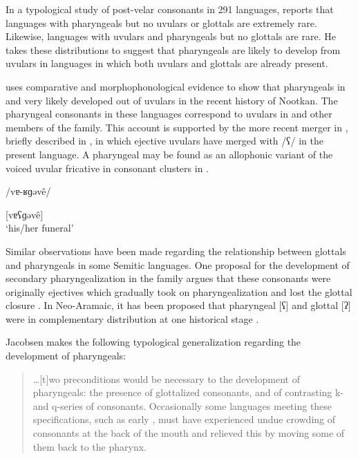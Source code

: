   In a typological study of post-velar consonants in 291 languages, \citet[49]{Sylak-Glassman2014} reports that languages with pharyngeals but no uvulars or glottals are extremely rare. Likewise, languages with uvulars and pharyngeals but no glottals are rare. He takes these distributions to suggest that pharyngeals are likely to develop from uvulars in languages in which both uvulars and glottals are already present.

  \citet{Jacobsen1969} uses comparative and morphophonological evidence to show that pharyngeals in  and  very likely developed out of uvulars in the recent history of Nootkan. The pharyngeal consonants in these languages correspond to uvulars in  and other members of the family. This account is supported by the more recent merger in , briefly described in , in which ejective uvulars have merged with /ʕ/ in the present language. A pharyngeal may be found as an allophonic variant of the voiced uvular fricative in consonant clusters in  .

\ea\label{ex:4.47}

/vɐ-ʁɡəvê/

[vɐʕɡəvê]\\
\glt ‘his/her funeral’
\citep[62]{Gong2018}
\z

  Similar observations have been made regarding the relationship between glottals and pharyngeals in some Semitic languages. One proposal for the development of secondary pharyngealization in the family argues that these consonants were originally ejectives which gradually took on pharyngealization and lost the glottal closure \citep{Zemánek1996}. In Neo-Aramaic, it has been proposed that pharyngeal [ʕ] and glottal [ʔ] were in complementary distribution at one historical stage \citep{Hoberman1985}.

  Jacobsen makes the following typological generalization regarding the development of pharyngeals:

\begin{quote}
…[t]wo preconditions would be necessary to the development of pharyngeals: the presence of glottalized consonants, and of contrasting k- and q-series of consonants. Occasionally some languages meeting these specifications, such as early , must have experienced undue crowding of consonants at the back of the mouth and relieved this by moving some of them back to the pharynx.
\citep[152]{Jacobsen1969}
\end{quote}

